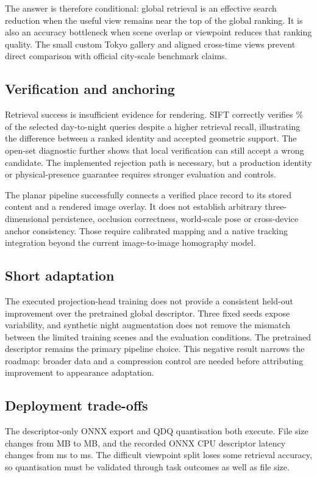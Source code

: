 The answer is therefore conditional: global retrieval is an effective search reduction when the useful view remains near the top of the global ranking. It is also an accuracy bottleneck when scene overlap or viewpoint reduces that ranking quality. The small custom Tokyo gallery and aligned cross-time views prevent direct comparison with official city-scale benchmark claims.

\subsection{Verification and anchoring}
Retrieval success is insufficient evidence for rendering. SIFT correctly verifies \NightSiftVerified\% of the selected day-to-night queries despite a higher retrieval recall, illustrating the difference between a ranked identity and accepted geometric support. The open-set diagnostic further shows that local verification can still accept a wrong candidate. The implemented rejection path is necessary, but a production identity or physical-presence guarantee requires stronger evaluation and controls.

The planar pipeline successfully connects a verified place record to its stored content and a rendered image overlay. It does not establish arbitrary three-dimensional persistence, occlusion correctness, world-scale pose or cross-device anchor consistency. Those require calibrated mapping and a native tracking integration beyond the current image-to-image homography model.

\subsection{Short adaptation}
The executed projection-head training does not provide a consistent held-out improvement over the pretrained global descriptor. Three fixed seeds expose variability, and synthetic night augmentation does not remove the mismatch between the limited training scenes and the evaluation conditions. The pretrained descriptor remains the primary pipeline choice. This negative result narrows the roadmap: broader data and a compression control are needed before attributing improvement to appearance adaptation.

\subsection{Deployment trade-offs}
The descriptor-only ONNX export and QDQ quantisation both execute. File size changes from \FpModelMB{} MB to \IntModelMB{} MB, and the recorded ONNX CPU descriptor latency changes from \FpLatency{} ms to \IntLatency{} ms. The difficult viewpoint split loses some retrieval accuracy, so quantisation must be validated through task outcomes as well as file size.

